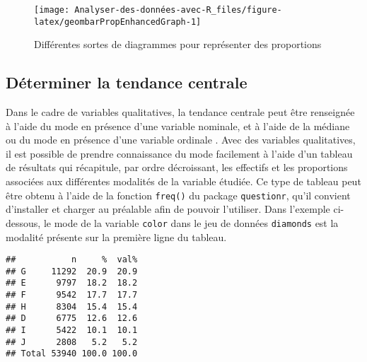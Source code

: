 \documentclass[
  french,
]{book}
\newenvironment{Shaded}{\begin{snugshade}}{\end{snugshade}}
\newcommand{\DataTypeTok}[1]{\textcolor[rgb]{0.13,0.29,0.53}{#1}}
\newcommand{\KeywordTok}[1]{\textcolor[rgb]{0.13,0.29,0.53}{\textbf{#1}}}
\newcommand{\NormalTok}[1]{#1}
\newcommand{\OperatorTok}[1]{\textcolor[rgb]{0.81,0.36,0.00}{\textbf{#1}}}
\newcommand{\OtherTok}[1]{\textcolor[rgb]{0.56,0.35,0.01}{#1}}
\newcommand{\StringTok}[1]{\textcolor[rgb]{0.31,0.60,0.02}{#1}}
\begin{document}
\begin{figure}

{\centering \texttt{[image: Analyser-des-données-avec-R\_files/figure-latex/geombarPropEnhancedGraph-1]} 

}

\caption{Différentes sortes de diagrammes pour représenter des proportions}\label{fig:geombarPropEnhancedGraph}
\end{figure}

\hypertarget{duxe9terminer-la-tendance-centrale}{%
\subsection{Déterminer la tendance centrale}\label{duxe9terminer-la-tendance-centrale}}

Dans le cadre de variables qualitatives, la tendance centrale peut être renseignée à l'aide du mode en présence d'une variable nominale, et à l'aide de la médiane ou du mode en présence d'une variable ordinale \autocite{gonzalesMeasuresCentralTendency2001}. Avec des variables qualitatives, il est possible de prendre connaissance du mode facilement à l'aide d'un tableau de résultats qui récapitule, par ordre décroissant, les effectifs et les proportions associées aux différentes modalités de la variable étudiée. Ce type de tableau peut être obtenu à l'aide de la fonction \texttt{freq()} du package \texttt{questionr}, qu'il convient d'installer et charger au préalable afin de pouvoir l'utiliser. Dans l'exemple ci-dessous, le mode de la variable \texttt{color} dans le jeu de données \texttt{diamonds} est la modalité présente sur la première ligne du tableau.

\begin{Shaded}
\end{Shaded}

\begin{verbatim}
##           n     %  val%
## G     11292  20.9  20.9
## E      9797  18.2  18.2
## F      9542  17.7  17.7
## H      8304  15.4  15.4
## D      6775  12.6  12.6
## I      5422  10.1  10.1
## J      2808   5.2   5.2
## Total 53940 100.0 100.0
\end{verbatim}
\end{document}
